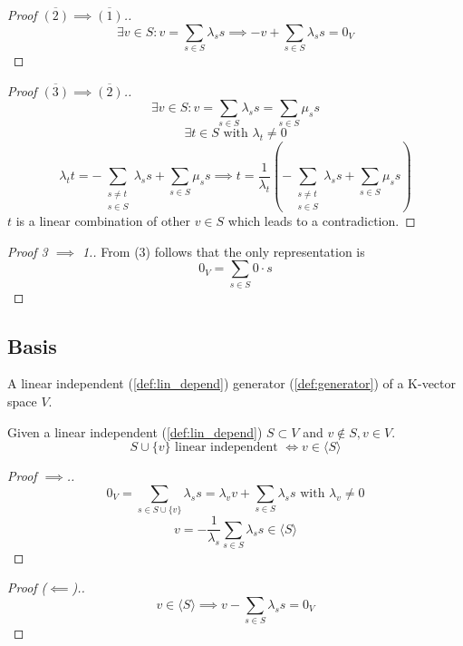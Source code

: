\begin{proof}[Proof \(\overline{(2)} \implies \overline{(1)}\).]
   \[\exists v \in S: v = \sum_{s \in S} \lambda_s s \implies -v + \sum_{s \in S} \lambda_s s = 0_V\]
\end{proof}
\begin{proof}[Proof \(\overline{(3)} \implies \overline{(2)}\).]
   \[\exists v \in S: v = \sum_{s \in S} \lambda_s s = \sum_{s \in S} \mu_s s\]
   \[\exists t \in S \text{ with } \lambda_t \neq 0\]
   \[\lambda_t t = -\sum_{\substack{s \neq t\\s \in S}} \lambda_s s + \sum_{s \in S} \mu_s s \implies t = \frac{1}{\lambda_t} \left(-\sum_{\substack{s \neq t\\s \in S}} \lambda_s s + \sum_{s \in S} \mu_s s\right)\]
   \(t\) is a linear combination of other \(v \in S\) which leads to a contradiction.
\end{proof}
\begin{proof}[Proof 3 \(\implies\) 1.]
   From (3) follows that the only representation is
   \[0_V = \sum_{s \in S} 0 \cdot s\]
\end{proof}

\subsection{Basis}
\begin{definition}[Basis]\label{def:basis}
   A linear independent (\ref{def:lin_depend}) generator (\ref{def:generator}) of a K-vector space \(V\).
\end{definition}

\begin{lemma}\label{lem:basis}
   Given a linear independent (\ref{def:lin_depend}) \(S \subset V\) and \(v \notin S, v \in V\).
   \[S \cup \{v\} \text{ linear independent } \iff v \in \langle S\rangle\]
\end{lemma}
\begin{proof}[Proof \(\implies\).]
   \[0_V = \sum_{s \in S \cup \{v\}} \lambda_s s = \lambda_v v + \sum_{s \in S} \lambda_s s \text{ with } \lambda_v \neq 0\]
   \[v = -\frac{1}{\lambda_s} \sum_{s \in S} \lambda_s s \in \langle S\rangle\]
\end{proof}
\begin{proof}[Proof (\(\impliedby\)).]
   \[v \in \langle S\rangle \implies v - \sum_{s \in S} \lambda_s s = 0_V\]
\end{proof}

